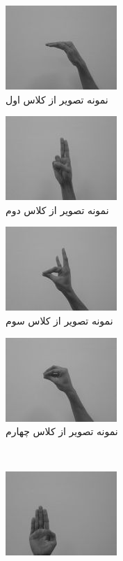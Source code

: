 \documentclass[11.5pt,a4paper]{article}
\begin{document}
\begin{figure}[h]
\center
	\begin{subfigure}{.2\textwidth}
		\includegraphics[scale=0.4]{Imgs/ds10.jpg}
		\caption{نمونه تصویر از کلاس اول}
	\end{subfigure}
	\begin{subfigure}{.2\textwidth}
		\includegraphics[scale=0.4]{Imgs/ds6.jpg}
		\caption{نمونه تصویر از کلاس دوم}
	\end{subfigure}
	\begin{subfigure}{.2\textwidth}
		\includegraphics[scale=0.4]{Imgs/ds8.jpg}
		\caption{نمونه تصویر از کلاس سوم}
	\end{subfigure}
	\begin{subfigure}{.2\textwidth}
		\includegraphics[scale=0.4]{Imgs/ds9.jpg}
		\caption{نمونه تصویر از کلاس چهارم}
	\end{subfigure}
\\
	\begin{subfigure}{.2\textwidth}
		\includegraphics[scale=0.4]{Imgs/ds1.jpg}

\end{subfigure}
\end{figure}
\end{document}
